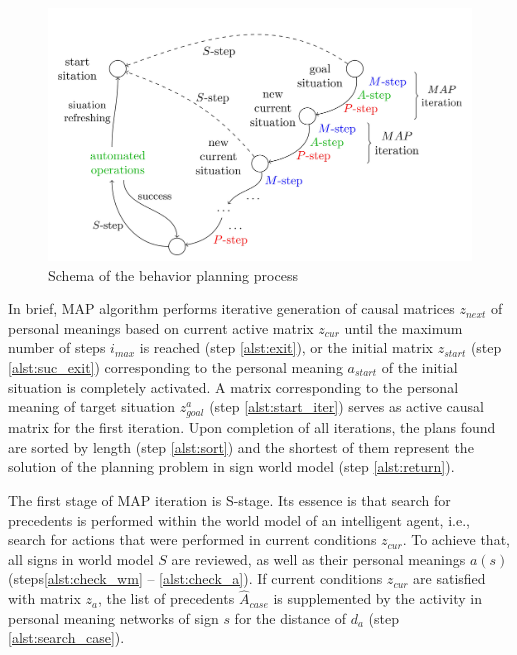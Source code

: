 \documentclass[review]{elsarticle}
\begin{document}
\begin{figure}
	\centering
	\includegraphics[width=\textwidth]{beh_plan2_en}
	\caption{Schema of the behavior planning process}	
	\label{fig:plan_algo}	
\end{figure}

In brief, MAP algorithm performs iterative generation of causal matrices $z_{next}$ of personal meanings based on current active matrix $z_{cur}$ until the maximum number of steps $i_{max}$ is reached (step \ref{alst:exit}), or the initial matrix $z_{start}$ (step \ref{alst:suc_exit}) corresponding to the personal meaning $a_{start}$ of the initial situation is completely activated. A matrix corresponding to the personal meaning of target situation $z_{goal}^a$ (step \ref{alst:start_iter}) serves as active causal matrix for the first iteration. Upon completion of all iterations, the plans found are sorted by length (step \ref{alst:sort}) and the shortest of them represent the solution of the planning problem in sign world model (step \ref{alst:return}).

The first stage of MAP iteration is S-stage. Its essence is that search for precedents is performed within the world model of an intelligent agent, i.e., search for actions that were performed in current conditions $z_{cur}$. To achieve that, all signs in world model $S$ are reviewed, as well as their personal meanings $a(s)$ (steps\ref{alst:check_wm} -- \ref{alst:check_a}). If current conditions $z_{cur}$ are satisfied with matrix $z_a$, the list of precedents $\hat A_{case}$ is supplemented by the activity in personal meaning networks of sign $s$ for the distance of $d_a$ (step \ref{alst:search_case}).
\end{document}
